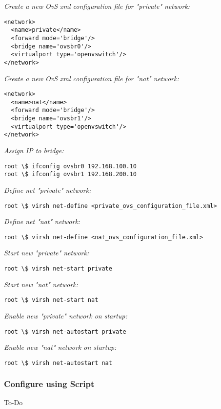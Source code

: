 \documentclass[12pt]{extarticle}
\begin{document}
\noindent
\textit{Create a new OvS xml configuration file for "private" network:}
\begin{verbatim}
<network>
  <name>private</name>
  <forward mode='bridge'/>
  <bridge name='ovsbr0'/>
  <virtualport type='openvswitch'/>
</network>
\end{verbatim}

\noindent
\textit{Create a new OvS xml configuration file for "nat" network:}
\begin{verbatim}
<network>
  <name>nat</name>
  <forward mode='bridge'/>
  <bridge name='ovsbr1'/>
  <virtualport type='openvswitch'/>
</network>
\end{verbatim}

\noindent
\textit{Assign IP to bridge:}
\begin{verbatim}
root \$ ifconfig ovsbr0 192.168.100.10
root \$ ifconfig ovsbr1 192.168.200.10
\end{verbatim}

\noindent
\textit{Define net "private" network:}
\begin{verbatim}
root \$ virsh net-define <private_ovs_configuration_file.xml>
\end{verbatim}

\noindent
\textit{Define net "nat" network:}
\begin{verbatim}
root \$ virsh net-define <nat_ovs_configuration_file.xml>
\end{verbatim}

\noindent
\textit{Start new "private" network:}
\begin{verbatim}
root \$ virsh net-start private
\end{verbatim}


\noindent
\textit{Start new "nat" network:}
\begin{verbatim}
root \$ virsh net-start nat
\end{verbatim}


\noindent
\textit{Enable new "private" network on startup:}
\begin{verbatim}
root \$ virsh net-autostart private
\end{verbatim}

\noindent
\textit{Enable new "nat" network on startup:}
\begin{verbatim}
root \$ virsh net-autostart nat
\end{verbatim}

\subsubsection{Configure using Script}
To-Do
\end{document}
